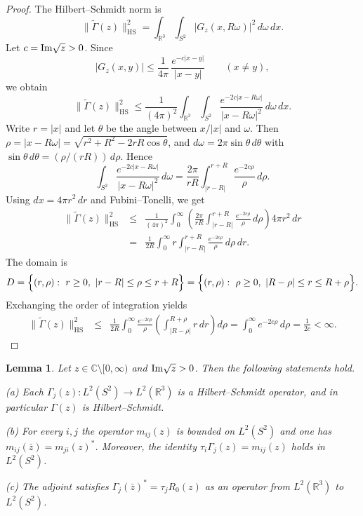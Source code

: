 \documentclass[a4paper,11pt]{article}
\numberwithin{equation}{section}
\def\re{\mathbb{R}}
\def\co{\mathbb{C}}
\renewcommand{\Im}{\text{{\rm Im}}}
\newtheorem{lem}[thm]{Lemma}
\theoremstyle{definition}
\theoremstyle{remark}
\begin{document}
\begin{proof}
The Hilbert--Schmidt norm is
$$
\|\widetilde{\Gamma}(z)\|_{\mathrm{HS}}^2
=
\int_{\re^3}\int_{S^2}\bigl|G_z(x,R\omega)\bigr|^2\,d\omega\,dx .
$$
Let $c=\Im\sqrt z>0$.
Since
$$
\bigl|G_z(x,y)\bigr|
\le
\frac{1}{4\pi}\,\frac{e^{-c|x-y|}}{|x-y|}
\qquad(x\ne y),
$$
we obtain
$$
\|\widetilde{\Gamma}(z)\|_{\mathrm{HS}}^2
\le
\frac{1}{(4\pi)^2}\int_{\re^3}\int_{S^2}
\frac{e^{-2c|x-R\omega|}}{|x-R\omega|^2}\,d\omega\,dx .
$$
Write $r=|x|$ and let $\theta$ be the angle between $x/|x|$ and $\omega$.
Then $\rho=|x-R\omega|=\sqrt{r^2+R^2-2rR\cos\theta}$, and
$d\omega=2\pi\sin\theta\,d\theta$ with $\sin\theta\,d\theta=(\rho/(rR))\,d\rho$.
Hence
$$
\int_{S^2}\frac{e^{-2c|x-R\omega|}}{|x-R\omega|^2}\,d\omega
=
\frac{2\pi}{rR}\int_{|r-R|}^{r+R}\frac{e^{-2c\rho}}{\rho}\,d\rho .
$$
Using $dx=4\pi r^2\,dr$ and Fubini--Tonelli, we get
\begin{eqnarray*}
\|\widetilde{\Gamma}(z)\|_{\mathrm{HS}}^2
&\le&
\frac{1}{(4\pi)^2}
\int_0^\infty\left(
\frac{2\pi}{rR}
\int_{|r-R|}^{r+R}\frac{e^{-2c\rho}}{\rho}\,d\rho\right)
4\pi r^2\,dr \\
&=&
\frac{1}{2R}\int_0^\infty r
\int_{|r-R|}^{r+R}\frac{e^{-2c\rho}}{\rho}\,d\rho\,dr.
\end{eqnarray*}
The domain is
$$
D=\Bigl\{(r,\rho):\ r\ge0,\ |r-R|\le \rho \le r+R\Bigr\}
=
\Bigl\{(r,\rho):\ \rho\ge0,\ |R-\rho|\le r \le R+\rho\Bigr\}.
$$
Exchanging the order of integration yields
\begin{eqnarray*}
\|\widetilde{\Gamma}(z)\|_{\mathrm{HS}}^2
&\le&
\frac{1}{2R}\int_0^\infty \frac{e^{-2c\rho}}{\rho}
\left(\int_{|R-\rho|}^{R+\rho} r\,dr\right)d\rho
=
\int_0^\infty e^{-2c\rho}\,d\rho
=
\frac{1}{2c}
<
\infty .
\end{eqnarray*}
\end{proof}

\begin{lem}\label{lem:maps}
Let $z\in\co\setminus[0,\infty)$ and $\Im\sqrt z>0$.
Then the following statements hold.

{\rm (a)} Each $\Gamma_j(z):L^2(S^2)\to L^2(\re^3)$ is a Hilbert--Schmidt
operator, and in particular $\Gamma(z)$ is Hilbert--Schmidt.

{\rm (b)} For every $i,j$ the operator $m_{ij}(z)$ is bounded on $L^2(S^2)$ and
one has $m_{ij}(\bar z)=m_{ji}(z)^{\ast}$.
Moreover, the identity $\tau_i\Gamma_j(z)=m_{ij}(z)$ holds in $L^2(S^2)$.

{\rm (c)} The adjoint satisfies $\Gamma_j(\bar z)^{\ast}=\tau_j R_0(z)$
as an operator from $L^2(\re^3)$ to $L^2(S^2)$.
\end{lem}
\end{document}

